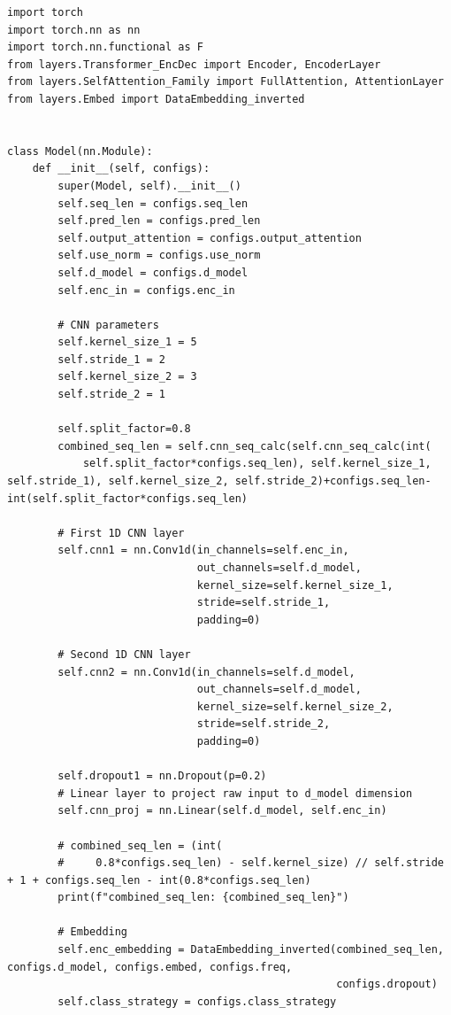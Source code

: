 \documentclass[stu,12pt,floatsintext]{apa7}
\begin{document}
\begin{verbatim}
import torch
import torch.nn as nn
import torch.nn.functional as F
from layers.Transformer_EncDec import Encoder, EncoderLayer
from layers.SelfAttention_Family import FullAttention, AttentionLayer
from layers.Embed import DataEmbedding_inverted


class Model(nn.Module):
    def __init__(self, configs):
        super(Model, self).__init__()
        self.seq_len = configs.seq_len
        self.pred_len = configs.pred_len
        self.output_attention = configs.output_attention
        self.use_norm = configs.use_norm
        self.d_model = configs.d_model
        self.enc_in = configs.enc_in

        # CNN parameters
        self.kernel_size_1 = 5
        self.stride_1 = 2
        self.kernel_size_2 = 3
        self.stride_2 = 1

        self.split_factor=0.8
        combined_seq_len = self.cnn_seq_calc(self.cnn_seq_calc(int(
            self.split_factor*configs.seq_len), self.kernel_size_1, self.stride_1), self.kernel_size_2, self.stride_2)+configs.seq_len-int(self.split_factor*configs.seq_len)

        # First 1D CNN layer
        self.cnn1 = nn.Conv1d(in_channels=self.enc_in,
                              out_channels=self.d_model,
                              kernel_size=self.kernel_size_1,
                              stride=self.stride_1,
                              padding=0)

        # Second 1D CNN layer
        self.cnn2 = nn.Conv1d(in_channels=self.d_model,
                              out_channels=self.d_model,
                              kernel_size=self.kernel_size_2,
                              stride=self.stride_2,
                              padding=0)

        self.dropout1 = nn.Dropout(p=0.2)
        # Linear layer to project raw input to d_model dimension
        self.cnn_proj = nn.Linear(self.d_model, self.enc_in)

        # combined_seq_len = (int(
        #     0.8*configs.seq_len) - self.kernel_size) // self.stride + 1 + configs.seq_len - int(0.8*configs.seq_len)
        print(f"combined_seq_len: {combined_seq_len}")

        # Embedding
        self.enc_embedding = DataEmbedding_inverted(combined_seq_len, configs.d_model, configs.embed, configs.freq,
                                                    configs.dropout)
        self.class_strategy = configs.class_strategy


\end{verbatim}
\end{document}
